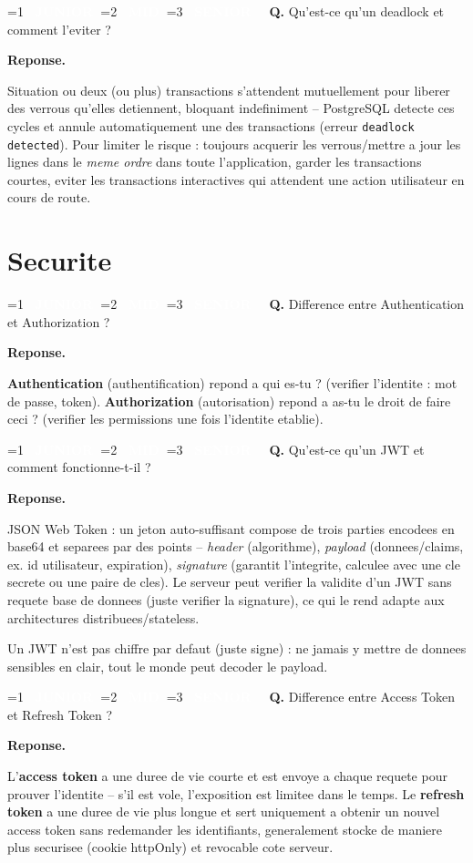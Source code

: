 \documentclass[11pt,a4paper]{article}
\newcommand{\badgeJ}{\textcolor{white}{\colorbox{junior}{\small\bfseries\ JUNIOR\ }}}
\newcommand{\badgeM}{\textcolor{white}{\colorbox{mid}{\small\bfseries\ MID\ }}}
\newcommand{\badgeS}{\textcolor{white}{\colorbox{senior}{\small\bfseries\ SENIOR\ }}}
\newcounter{qcount}
\newenvironment{qa}[2]{%
  \stepcounter{qcount}%
  \par\vspace{6pt}%
  \noindent\colorbox{qbg}{\parbox{\dimexpr\linewidth-12pt}{\vspace{2pt}%
  \ifnum#1=1 \badgeJ\fi\ifnum#1=2 \badgeM\fi\ifnum#1=3 \badgeS\fi
  \ \textbf{Q\theqcount.} #2\vspace{2pt}}}\par\vspace{4pt}%
  \noindent\textbf{\color{accent}Reponse.}\ \ignorespaces
}{%
  \par\vspace{8pt}%
}
\begin{document}
\begin{qa}{3}{Qu'est-ce qu'un deadlock et comment l'eviter ?}
Situation ou deux (ou plus) transactions s'attendent mutuellement pour
liberer des verrous qu'elles detiennent, bloquant indefiniment -- PostgreSQL
detecte ces cycles et annule automatiquement une des transactions
(erreur \texttt{deadlock detected}). Pour limiter le risque : toujours
acquerir les verrous/mettre a jour les lignes dans le \emph{meme ordre} dans
toute l'application, garder les transactions courtes, eviter les
transactions interactives qui attendent une action utilisateur en cours de
route.
\end{qa}

\newpage
\section{Securite}

\begin{qa}{1}{Difference entre Authentication et Authorization ?}
\textbf{Authentication} (authentification) repond a \og{}qui es-tu ?\fg{}
(verifier l'identite : mot de passe, token). \textbf{Authorization}
(autorisation) repond a \og{}as-tu le droit de faire ceci ?\fg{} (verifier les
permissions une fois l'identite etablie).
\end{qa}

\begin{qa}{2}{Qu'est-ce qu'un JWT et comment fonctionne-t-il ?}
JSON Web Token : un jeton auto-suffisant compose de trois parties encodees en
base64 et separees par des points -- \emph{header} (algorithme),
\emph{payload} (donnees/claims, ex. id utilisateur, expiration),
\emph{signature} (garantit l'integrite, calculee avec une cle secrete ou une
paire de cles). Le serveur peut verifier la validite d'un JWT sans requete
base de donnees (juste verifier la signature), ce qui le rend adapte aux
architectures distribuees/stateless.
\begin{piege}
Un JWT n'est pas chiffre par defaut (juste signe) : ne jamais y mettre de
donnees sensibles en clair, tout le monde peut decoder le payload.
\end{piege}
\end{qa}

\begin{qa}{2}{Difference entre Access Token et Refresh Token ?}
L'\textbf{access token} a une duree de vie courte et est envoye a chaque
requete pour prouver l'identite -- s'il est vole, l'exposition est limitee
dans le temps. Le \textbf{refresh token} a une duree de vie plus longue et
sert uniquement a obtenir un nouvel access token sans redemander les
identifiants, generalement stocke de maniere plus securisee (cookie
httpOnly) et revocable cote serveur.
\end{qa}
\end{document}
